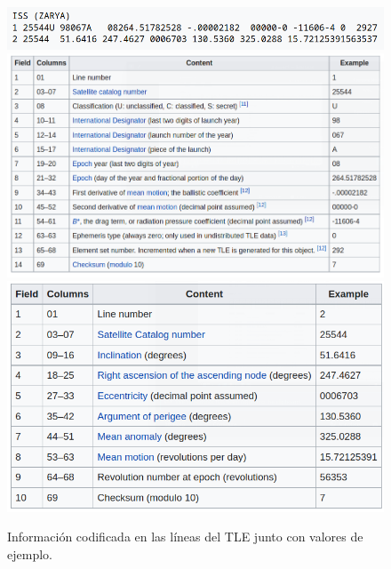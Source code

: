 \documentclass[../../main.tex]{subfiles}
\begin{document}
\begin{figure}[H]
    \centering
    {\includegraphics[width=0.9\linewidth]{tle.png}}\\[1PC]
    {\includegraphics[width=0.9\linewidth]{valores-1.png}}\\[1PC]
    {\includegraphics[width=0.7\linewidth]{valores-2.png}}
    \caption{Información codificada en las líneas del TLE junto con valores de ejemplo\cite{tle-wiki}.}
    \label{fig::valores-tle}
\end{figure}
\end{document}

